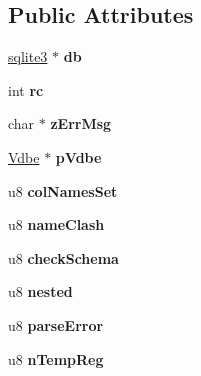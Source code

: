\subsection*{Public Attributes}
\begin{DoxyCompactItemize}
\item 
\hypertarget{struct_parse_a44364e5e1197927f89864ec345bc5491}{\hyperlink{structsqlite3}{sqlite3} $\ast$ {\bfseries db}}\label{struct_parse_a44364e5e1197927f89864ec345bc5491}

\item 
\hypertarget{struct_parse_a897c2ea40a1065d49a134f18ca251637}{int {\bfseries rc}}\label{struct_parse_a897c2ea40a1065d49a134f18ca251637}

\item 
\hypertarget{struct_parse_a04146757986ff4654c7b321654896e81}{char $\ast$ {\bfseries z\-Err\-Msg}}\label{struct_parse_a04146757986ff4654c7b321654896e81}

\item 
\hypertarget{struct_parse_a81774053fd5063046f532c07e3daa98b}{\hyperlink{struct_vdbe}{Vdbe} $\ast$ {\bfseries p\-Vdbe}}\label{struct_parse_a81774053fd5063046f532c07e3daa98b}

\item 
\hypertarget{struct_parse_a4c71fde634168abc1e3e32c70704b1ac}{u8 {\bfseries col\-Names\-Set}}\label{struct_parse_a4c71fde634168abc1e3e32c70704b1ac}

\item 
\hypertarget{struct_parse_a7181d6ce88c6ebef5f774148632dec91}{u8 {\bfseries name\-Clash}}\label{struct_parse_a7181d6ce88c6ebef5f774148632dec91}

\item 
\hypertarget{struct_parse_a13b660ed90fc83565aa542a10549ec9f}{u8 {\bfseries check\-Schema}}\label{struct_parse_a13b660ed90fc83565aa542a10549ec9f}

\item 
\hypertarget{struct_parse_a33d62687b6d368acf94e954490358819}{u8 {\bfseries nested}}\label{struct_parse_a33d62687b6d368acf94e954490358819}

\item 
\hypertarget{struct_parse_a88a55ea01daa87419b1f85d38a08cd90}{u8 {\bfseries parse\-Error}}\label{struct_parse_a88a55ea01daa87419b1f85d38a08cd90}

\item 
\hypertarget{struct_parse_ae292001c732781b6b94d28ca303e1aa5}{u8 {\bfseries n\-Temp\-Reg}}\label{struct_parse_ae292001c732781b6b94d28ca303e1aa5}


\end{DoxyCompactItemize}
